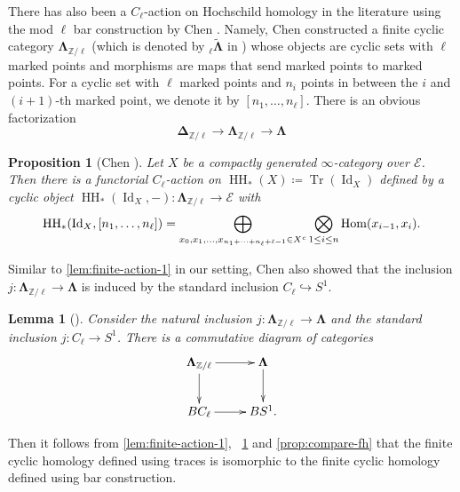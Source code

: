 \documentclass[11pt]{amsart}
\numberwithin{equation}{section}
\theoremstyle{plain}
\newtheorem{Prop}[prop]{Proposition}
\newtheorem{Lemma}[lemma]{Lemma}
\theoremstyle{definition}
\theoremstyle{remark}
\newcommand{\bZ} { {\mathbb{Z}}}
\newcommand{\cE} { {\mathcal{E}}}
\newcommand{\HOM}{{ \textnormal{Hom}  }}
\newcommand{\Id}{{\operatorname{Id}}}
\newcommand\HH{\operatorname{HH}}
\newcommand\Tr{\operatorname{Tr}}
\begin{document}
There has also been a $C_\ell$-action on Hochschild homology in the literature using the mod $\ell$ bar construction by Chen \cite{Chen1}. Namely, Chen constructed a finite cyclic category $\boldsymbol{\Lambda}_{\bZ/\ell}$ (which is denoted by ${}_\ell\widetilde{\boldsymbol{\Lambda}}$ in \cite{Chen1}) whose objects are cyclic sets with $\ell$ marked points and morphisms are maps that send marked points to marked points. For a cyclic set with $\ell$ marked points and $n_i$ points in between the $i$ and $(i+1)$-th marked point, we denote it by $[n_1, \dots, n_\ell]$. There is an obvious factorization
\[\boldsymbol{\Delta}_{\bZ/\ell} \to \boldsymbol{\Lambda}_{\bZ/\ell} \to \boldsymbol{\Lambda}\]

\begin{Prop}[{Chen \cite[Proposition 3.19]{Chen1}}]\label{prop:Chen}
    Let $X$ be a compactly generated $\infty$-category over $\cE$. Then there is a functorial $C_\ell$-action on $\HH_*(X) \coloneqq \Tr(\Id_X)$ defined by a cyclic object $\HH_*(\Id_X, -): \boldsymbol{\Lambda}_{\bZ/\ell} \to \cE$ with
    \begin{align*}
        \HH_*(\Id_X, [n_1, \dots, n_\ell]) = \bigoplus_{x_0, x_1, \dots, x_{n_1+\dots+n_\ell+\ell-1} \in X^c} \bigotimes_{1\leq i\leq n} \HOM(x_{i-1}, x_i).
    \end{align*}
\end{Prop}

Similar to \autoref{lem:finite-action-1} in our setting, Chen also showed that the inclusion $j: \boldsymbol{\Lambda}_{\bZ/\ell} \to \boldsymbol{\Lambda}$ is induced by the standard inclusion $C_\ell \hookrightarrow S^1$.

\begin{Lemma}[{\cite[Lemma 5.1]{Chen1}}]\label{lem:finite-action-2}
Consider the natural inclusion $j: \boldsymbol{\Lambda}_{\bZ/\ell} \to \boldsymbol{\Lambda}$
and the standard inclusion $j: C_\ell \to S^1$. There is a commutative diagram of categories
\[\xymatrix{
\boldsymbol{\Lambda}_{\bZ/\ell} \ar[r] \ar[d] & \boldsymbol{\Lambda} \ar[d] \\
BC_\ell \ar[r] & BS^1.
}\]
\end{Lemma}


Then it follows from \autoref{lem:finite-action-1}, ~\ref{lem:finite-action-2} and \autoref{prop:compare-fh} that the finite cyclic homology defined using traces is isomorphic to the finite cyclic homology defined using bar construction.
\end{document}
